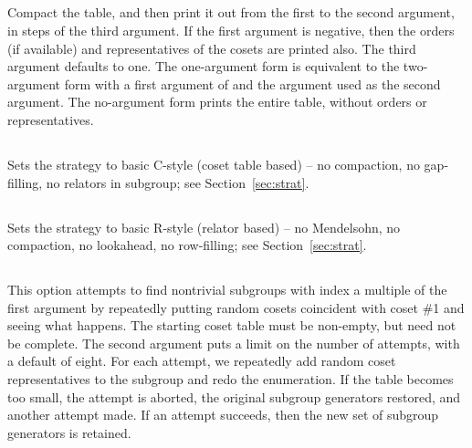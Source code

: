\subsection{}

Compact the table, and then print it out from the first to the second
  argument, in steps of the third argument.
If the first argument is negative, then the orders (if available) and
  representatives of the cosets are printed also.
The third argument defaults to one.
The one-argument form is equivalent to the two-argument form with a first
  argument of  and the argument used as the second argument.
The no-argument form prints the entire table, without orders or
  representatives.

\subsection{}

Sets the strategy to basic C-style (coset table based) -- 
  no compaction, no gap-filling, no relators in subgroup; 
  see Section~\ref{sec:strat}.

\subsection{}

Sets the strategy to basic R-style (relator based) -- 
  no Mendelsohn, no compaction, no lookahead, no row-filling;
  see Section~\ref{sec:strat}.

\subsection{}

This option attempts to find nontrivial subgroups with index a multiple
  of the first argument by repeatedly putting random cosets coincident
  with coset \#1 and seeing what happens.
The starting coset table must be non-empty, but need not be complete.
The second argument puts a limit on the number of attempts, with a default
  of eight.
For each attempt, we repeatedly add random coset representatives to the 
  subgroup and redo the enumeration.
If the table becomes too small, the attempt is aborted, the original 
  subgroup generators restored, and another attempt made.
If an attempt succeeds, then the new set of subgroup generators is
  retained.

